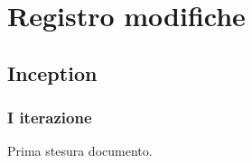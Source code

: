 \documentclass[10pt]{softeng}
\begin{document}
\startofdocument







\section{Registro modifiche}

\subsection{Inception}

\subsubsection{I iterazione}

Prima stesura documento.
\end{document}
